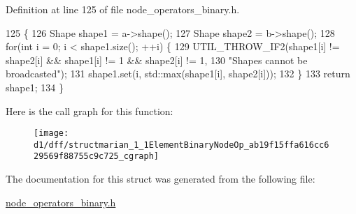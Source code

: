 Definition at line 125 of file node\+\_\+operators\+\_\+binary.\+h.


\begin{DoxyCode}
125                                  \{
126     Shape shape1 = a->shape();
127     Shape shape2 = b->shape();
128     \textcolor{keywordflow}{for}(\textcolor{keywordtype}{int} i = 0; i < shape1.size(); ++i) \{
129       UTIL\_THROW\_IF2(shape1[i] != shape2[i] && shape1[i] != 1 && shape2[i] != 1,
130                      \textcolor{stringliteral}{"Shapes cannot be broadcasted"});
131       shape1.set(i, std::max(shape1[i], shape2[i]));
132     \}
133     \textcolor{keywordflow}{return} shape1;
134   \}
\end{DoxyCode}


Here is the call graph for this function\+:
\nopagebreak
\begin{figure}[H]
\begin{center}
\leavevmode
\texttt{[image: d1/dff/structmarian\_1\_1ElementBinaryNodeOp\_ab19f15ffa616cc629569f88755c9c725\_cgraph]}
\end{center}
\end{figure}




The documentation for this struct was generated from the following file\+:\begin{DoxyCompactItemize}
\item 
\hyperlink{node__operators__binary_8h}{node\+\_\+operators\+\_\+binary.\+h}\end{DoxyCompactItemize}
